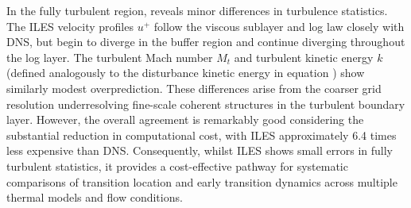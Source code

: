 In the fully turbulent region,  reveals minor differences in turbulence statistics. The \gls{ILES} velocity profiles $u^+$ follow the viscous sublayer and log law closely with \gls{DNS}, but begin to diverge in the buffer region and continue diverging throughout the log layer. The turbulent Mach number $M_t$ and turbulent kinetic energy $k$ (defined analogously to the disturbance kinetic energy in equation 
) show similarly modest overprediction. These differences arise from the coarser grid resolution underresolving fine-scale coherent structures in the turbulent boundary layer. However, the overall agreement is remarkably good considering the substantial reduction in computational cost, with \gls{ILES} approximately 6.4 times less expensive than \gls{DNS}. Consequently, whilst \gls{ILES} shows small errors in fully turbulent statistics, it provides a cost-effective pathway for systematic comparisons of transition location and early transition dynamics across multiple thermal models and flow conditions.






